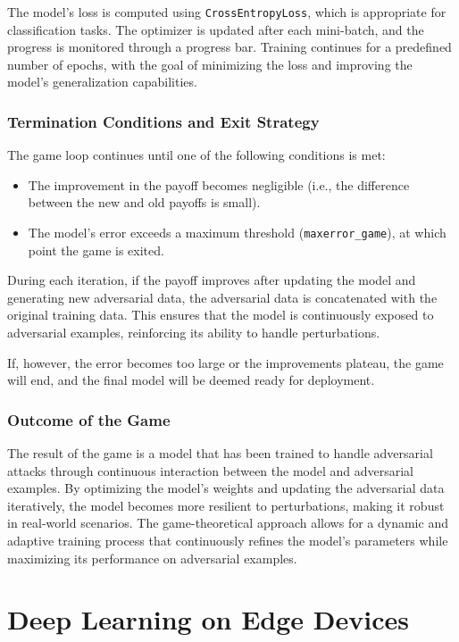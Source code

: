 \documentclass[9pt,a4paper,twoside]{rho-class/rho}
\begin{document}
The model’s loss is computed using \texttt{CrossEntropyLoss}, which is appropriate for classification tasks. The optimizer is updated after each mini-batch, and the progress is monitored through a progress bar. Training continues for a predefined number of epochs, with the goal of minimizing the loss and improving the model’s generalization capabilities.

\subsubsection{Termination Conditions and Exit Strategy}
The game loop continues until one of the following conditions is met:
\begin{itemize}
    \item The improvement in the payoff becomes negligible (i.e., the difference between the new and old payoffs is small).
    \item The model’s error exceeds a maximum threshold (\texttt{maxerror\_game}), at which point the game is exited.
\end{itemize}

During each iteration, if the payoff improves after updating the model and generating new adversarial data, the adversarial data is concatenated with the original training data. This ensures that the model is continuously exposed to adversarial examples, reinforcing its ability to handle perturbations.

If, however, the error becomes too large or the improvements plateau, the game will end, and the final model will be deemed ready for deployment.

\subsubsection{Outcome of the Game}
The result of the game is a model that has been trained to handle adversarial attacks through continuous interaction between the model and adversarial examples. By optimizing the model's weights and updating the adversarial data iteratively, the model becomes more resilient to perturbations, making it robust in real-world scenarios. The game-theoretical approach allows for a dynamic and adaptive training process that continuously refines the model's parameters while maximizing its performance on adversarial examples.








\section{Deep Learning on Edge Devices}
\end{document}
